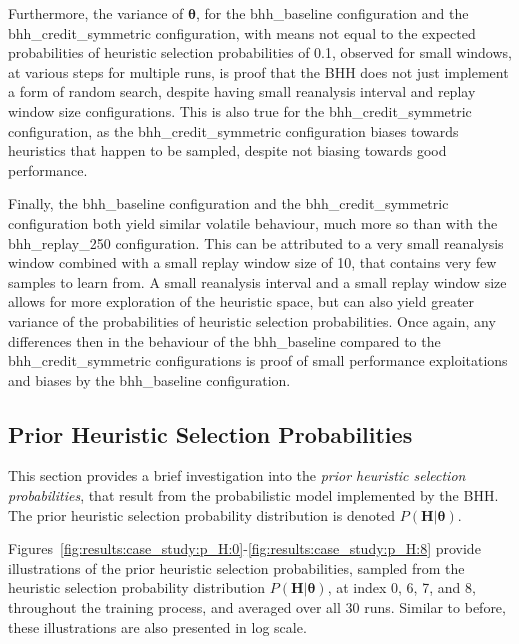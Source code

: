 Furthermore, the variance of $\boldsymbol{\theta}$, for the bhh\_baseline configuration and the bhh\_credit\_symmetric configuration, with means not equal to the expected probabilities of heuristic selection probabilities of 0.1, observed for small windows, at various steps for multiple runs, is proof that the \acs{BHH} does not just implement a form of random search, despite having small reanalysis interval and replay window size configurations. This is also true for the bhh\_credit\_symmetric configuration, as the bhh\_credit\_symmetric configuration biases towards heuristics that happen to be sampled, despite not biasing towards good performance.

Finally, the bhh\_baseline configuration and the bhh\_credit\_symmetric configuration both yield similar volatile behaviour, much more so than with the bhh\_replay\_250 configuration. This can be attributed to a very small reanalysis window combined with a small replay window size of 10, that contains very few samples to learn from. A small reanalysis interval and a small replay window size allows for more exploration of the heuristic space, but can also yield greater variance of the probabilities of heuristic selection probabilities. Once again, any differences then in the behaviour of the bhh\_baseline compared to the bhh\_credit\_symmetric configurations is proof of small performance exploitations and biases by the bhh\_baseline configuration.



\subsection{Prior Heuristic Selection Probabilities}\label{sec:results:case_study:prior_selec_prob}

This section provides a brief investigation into the \textit{prior heuristic selection probabilities}, that result from the probabilistic model implemented by the \acs{BHH}. The prior heuristic selection probability distribution is denoted $P(\boldsymbol{H} \vert \boldsymbol{\theta})$.

Figures~\ref{fig:results:case_study:p_H:0}-\ref{fig:results:case_study:p_H:8} provide illustrations of the prior heuristic selection probabilities, sampled from the heuristic selection probability distribution $P(\boldsymbol{H} \vert \boldsymbol{\theta})$, at index 0, 6, 7, and 8, throughout the training process, and averaged over all 30 runs. Similar to before, these illustrations are also presented in log scale.

